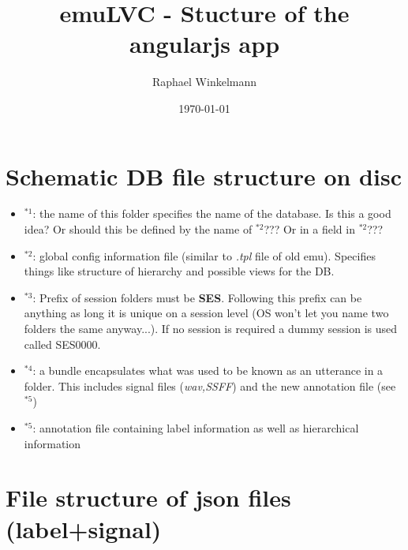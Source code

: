\documentclass[A4,12pt, utf8]{article}
\title{emuLVC - Stucture of the angularjs app}
\author{Raphael Winkelmann}
\date{\today}
\newcounter{treeline}
\newcommand{\treeroot}[1]{%
\node[above] at (0,0) {#1};%
\setcounter{treeline}{0}
}
\newcommand{\altentry}[2]{%
\draw[->] (#2-1,-\value{treeline}/2) -- (#2-1,-\value{treeline}/2-0.5) -- (#2+0.5,-\value{treeline}/2-0.5) node[right] {#1};
\foreach \x in {1,...,#2}
{   \draw (\x-1,-\value{treeline}/2) -- (\x-1,-\value{treeline}/2-0.5);
}
\stepcounter{treeline}
}
\begin{document}

\section{Schematic DB file structure on disc}



\begin{itemize}
  \item $^{*1}$: the name of this folder specifies the name of the database. Is this a good idea? Or should this be defined by the name of $^{*2}$??? Or in a field in $^{*2}$???
  \item $^{*2}$: global config information file (similar to \textit{.tpl} file of old emu). Specifies things like structure of hierarchy and possible views for the DB.
  \item $^{*3}$: Prefix of session folders must be \textbf{SES}. Following this prefix can be anything as long it is unique on a session level (OS won't let you name two folders the same anyway...). If no session is required a dummy session is used called SES0000.
  \item $^{*4}$: a bundle encapsulates what was used to be known as an utterance in a folder. This includes signal files (\textit{wav,SSFF}) and the new annotation file (see $^{*5}$)
  \item $^{*5}$: annotation file containing label information as well as hierarchical information
\end{itemize}




\section{File structure of json files (label+signal)}
\end{document}
